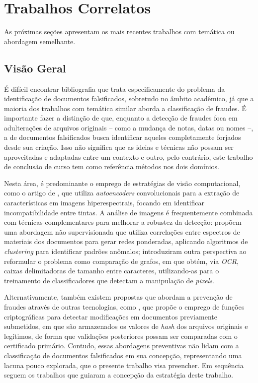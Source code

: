 \chapter{Trabalhos Correlatos}

As próximas seções apresentam os mais recentes trabalhos com temática ou abordagem semelhante.

\section{Visão Geral}

É difícil encontrar bibliografia que trata especificamente do problema da identificação de documentos falsificados, sobretudo no âmbito acadêmico, já que a maioria dos trabalhos com temática similar aborda a classificação de fraudes. É importante fazer a distinção de que, enquanto a detecção de fraudes foca em adulterações de arquivos originais -- como a mudança de notas, datas ou nomes --, a de documentos falsificados busca identificar aqueles completamente forjados desde sua criação. Isso não significa que as ideias e técnicas não possam ser aproveitadas e adaptadas entre um contexto e outro, pelo contrário, este trabalho de conclusão de curso tem como referência métodos nos dois domínios.

Nesta área, é predominante o emprego de estratégias de visão computacional, como o artigo de \citeauthor*{inkcnn} \cite*{inkcnn}, que utiliza \textit{autoencoders} convolucionais para a extração de características em imagens hiperespectrais, focando em identificar incompatibilidade entre tintas. A análise de imagens é frequentemente combinada com técnicas complementares para melhorar a robustez da detecção: \citeauthor*{unsupervisednetwork} \cite*{unsupervisednetwork} propõem uma abordagem não supervisionada que utiliza correlações entre espectros de materiais dos documentos para gerar redes ponderadas, aplicando algoritmos de \textit{clustering} para identificar padrões anômalos; \citeauthor*{ocrgraph} \cite*{ocrgraph} introduziram outra perspectiva ao reformular o problema como comparação de grafos, em que obtém, via \textit{OCR}, caixas delimitadoras de tamanho entre caracteres, utilizando-as para o treinamento de classificadores que detectam a manipulação de \textit{pixels}.

Alternativamente, também existem propostas que abordam a prevenção de fraudes através de outras tecnologias, como \citeauthor*{hashdetection} \cite*{hashdetection}, que propõe o emprego de funções criptográficas para detectar modificações em documentos previamente submetidos, em que são armazenados os valores de \textit{hash} dos arquivos originais e legítimos, de forma que validações posteriores possam ser comparadas com o certificado primário. Contudo, essas abordagens preventivas não lidam com a classificação de documentos falsificados em sua concepção, representando uma lacuna pouco explorada, que o presente trabalho visa preencher. Em sequência seguem os trabalhos que guiaram a concepção da estratégia deste trabalho.

